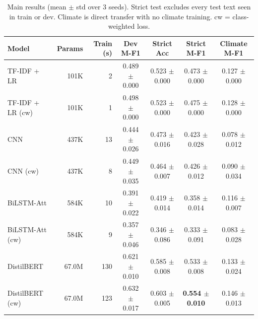 \begin{table}[t]
\centering
\caption{Main results (mean $\pm$ std over 3 seeds). Strict test excludes every test text seen in train or dev. Climate is direct transfer with no climate training. cw = class-weighted loss.}
\label{tab:main}
\setlength{\tabcolsep}{4pt}
\begin{tabular}{lrrcccc}
\toprule
Model & Params & Train (s) & Dev M-F1 & Strict Acc & Strict M-F1 & Climate M-F1 \\
\midrule
TF-IDF + LR & 101K & 2 & 0.489 $\pm$ 0.000 & 0.523 $\pm$ 0.000 & 0.473 $\pm$ 0.000 & 0.127 $\pm$ 0.000 \\
TF-IDF + LR (cw) & 101K & 1 & 0.498 $\pm$ 0.000 & 0.523 $\pm$ 0.000 & 0.475 $\pm$ 0.000 & 0.128 $\pm$ 0.000 \\
CNN & 437K & 13 & 0.444 $\pm$ 0.026 & 0.473 $\pm$ 0.016 & 0.423 $\pm$ 0.028 & 0.078 $\pm$ 0.012 \\
CNN (cw) & 437K & 8 & 0.449 $\pm$ 0.035 & 0.464 $\pm$ 0.007 & 0.426 $\pm$ 0.012 & 0.090 $\pm$ 0.034 \\
BiLSTM-Att & 584K & 10 & 0.391 $\pm$ 0.022 & 0.419 $\pm$ 0.014 & 0.358 $\pm$ 0.014 & 0.116 $\pm$ 0.007 \\
BiLSTM-Att (cw) & 584K & 9 & 0.357 $\pm$ 0.046 & 0.346 $\pm$ 0.086 & 0.333 $\pm$ 0.091 & 0.083 $\pm$ 0.028 \\
DistilBERT & 67.0M & 130 & 0.621 $\pm$ 0.010 & 0.585 $\pm$ 0.008 & 0.533 $\pm$ 0.008 & 0.133 $\pm$ 0.024 \\
DistilBERT (cw) & 67.0M & 123 & 0.632 $\pm$ 0.017 & 0.603 $\pm$ 0.005 & \textbf{0.554 $\pm$ 0.010} & 0.146 $\pm$ 0.013 \\
\bottomrule
\end{tabular}
\end{table}
